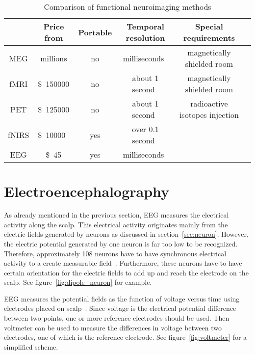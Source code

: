 
\begin{table}[h]
	\centering
	\begin{tabular}{|c|c|c|c|c|c|}\hline
			& Price	from				& Portable	& Temporal resolution		& Special requirements			\\\hline
\gls{MEG}	& millions\pMEG				& no		& milliseconds~\tresol		& magnetically shielded room	\\\hline
\gls{fMRI}	& \SI{150000}[\$]\pfMRI		& no		& about 1 second~\tresol	& magnetically shielded room	\\\hline
\gls{PET}	& \SI{125000}[\$]\pPET		& no		& about 1 second~\tresol	& radioactive isotopes injection\\\hline
\gls{fNIRS}	& \SI{10000}[\$]{}~\pNIRS	& yes		& over 0.1 second~\pNIRS	&								\\\hline
\gls{EEG}	& \SI{45}[\$]\pEEG			& yes		& milliseconds~\tresol		&								\\\hline
	\end{tabular}
	\caption{Comparison of functional neuroimaging methods}
	\label{tab:neuroimaging}
\end{table}

\section{Electroencephalography}
\label{sec:EEG}

As already mentioned in the previous section, \gls{EEG} measures the electrical activity along the scalp. This electrical activity originates mainly from the electric fields generated by neurons as discussed in section~\ref{sec:neuron}. However, the electric potential generated by one neuron is far too low to be recognized. Therefore, approximately 108 neurons have to have synchronous electrical activity to a create measurable field~\cite{field_count}. Furthermore, these neurons have to have certain orientation for the electric fields to add up and reach the electrode on the scalp. See figure~\ref{fig:dipole_neuron} for example.

\gls{EEG} measures the potential fields as the function of voltage versus time using electrodes placed on scalp~\cite{field_count}. Since voltage is the electrical potential difference between two points, one or more reference electrodes should be used. Then voltmeter can be used to measure the differences in voltage between two electrodes, one of which is the reference electrode. See figure~\ref{fig:voltmeter} for a simplified scheme.

